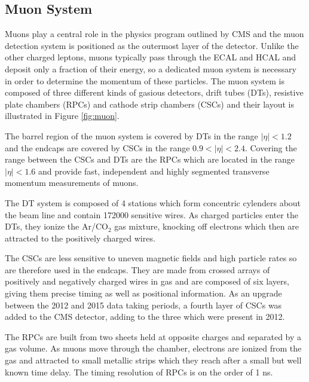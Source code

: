  \subsection{Muon System}

Muons play a central role in the physics program outlined
 by CMS and the muon detection system is positioned 
 as the outermost layer of the detector. 
Unlike the other charged leptons, 
 muons typically pass through the ECAL and HCAL and
 deposit only a fraction of their energy, so
 a dedicated muon system is necessary in order to
 determine the momentum of these particles.
The muon system is composed of three different kinds
 of gasious detectors,
 drift tubes (DTs), resistive plate chambers (RPCs)
 and cathode strip chambers (CSCs) and their layout is
 illustrated in Figure \ref{fig:muon}.

The barrel region of the muon system is covered by DTs
 in the range $|\eta|<1.2$ and the endcaps are covered 
 by CSCs in the range $0.9<|\eta|<2.4$.
Covering the range between
 the CSCs and DTs are the RPCs which are located
 in the range $|\eta|<1.6$ and provide fast,
 independent and highly segmented transverse
 momentum measurements of muons. 

The DT system is composed of 4 stations which 
 form concentric cylenders about the beam line
 and contain 172000 sensitive wires. 
As charged particles enter the DTs,
 they ionize the Ar/CO$_2$ gas mixture,
 knocking off electrons  which 
 then are attracted to the positively charged wires.

The CSCs are less sensitive to uneven magnetic fields
 and high particle rates so are therefore used in the endcaps.
They are made from crossed arrays of positively 
 and negatively charged wires in gas and are composed
 of six layers, giving them precise timing
 as well as positional information. 
As an upgrade between the 2012 and 2015 data taking periods,
 a fourth layer of CSCs was added to the CMS detector, 
 adding to the three which were present in 2012.

The RPCs are built from two sheets held at opposite
 charges and separated by a gas volume.
As muons move through the chamber, electrons
 are ionized from the gas and attracted to small
 metallic strips which they reach after a small
 but well known time delay. 
The timing resolution of RPCs is on the order of 1 ns. 

